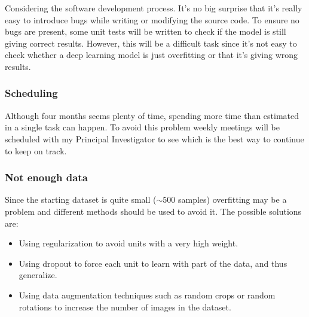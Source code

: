 Considering the software development process. It's no big surprise that it's really easy to
introduce bugs while writing or modifying the source code. To ensure no bugs are present,
some unit tests will be written to check if the model is still giving correct results.
However, this will be a difficult task since it's not easy to check whether a deep 
learning model is just overfitting or that it's giving wrong results.

\subsubsection{Scheduling}

Although four months seems plenty of time, spending more time than estimated in a single task
can happen. To avoid this problem weekly meetings will be scheduled with my Principal Investigator
to see which is the best way to continue to keep on track.

\subsubsection{Not enough data}

Since the starting dataset is quite small (\( \sim 500 \) samples) overfitting may be a problem
and different methods should be used to avoid it. The possible solutions are:
\begin{itemize}
  \item Using regularization to avoid units with a very high weight.
  \item Using dropout to force each unit to learn with part of the data, and thus generalize.
  \item Using data augmentation techniques such as random crops or random rotations to increase
  the number of images in the dataset.
\end{itemize}
